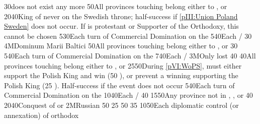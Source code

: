 {}{30}{\payshanse does not exist any more}%
%
%
{}{50}{All provinces touching \regionBaltique belong either to \SUE,
  \paysbrandebourg or \paysdanemark}%
%
%
{20}{40}{King of  never on the Swedish throne;
  half-success if \ref{pIII:Union Poland Sweden} does not occur. If \POL is
  protestant or Supporter of the Orthodoxy, this cannot be chosen}%
%
%
%
{5}{30}{Each turn of Commercial Domination on the }%
%
%
{5}{40}{Each \COL/\TP}%
%
%
{}{30}{}%
%
\EUobjective4M{Dominum Marii Baltici}{}%
{}{50}{All provinces touching \regionBaltique belong either to \SUE,
  \paysbrandebourg or \paysdanemark}%
%
%
{}{30}{}%
%
%
%
{5}{40}{Each turn of Commercial Domination on the }%
%
%
{7}{40}{Each \COL/\TP}%
%
\EUobjective3M{Only \provinceNeva lost}{}%
{}{40}{}%
%
%
{}{40}{All provinces touching \regionBaltique belong either to \SUE,
  \paysbrandebourg or \paysdanemark}%
%
%
{25}{50}{During \ref{pVI:WoPS}, \SUE must either support the Polish King and
  win (50 \VPs), or prevent a winning \FRA supporting the Polish King (25
  \VPs). Half-success if the event does not occur}%
%
%
%
{5}{40}{Each turn of Commercial Domination on the }%
%
%
{10}{40}{Each \COL/\TP}%
%
%
{}{40}{}%
%
 {15}{50}{Any province
  not in \regionNorvege, \regionDanemark, \regionFinlande or \regionSuede}%
%
%
{}{40}{}%
%
 
%
%
{20}{40}{Conquest of \payspskov or \paysryazan}%
%
\EUobjective2M{Russian \provinceSmolenska}{}%
{}{50}{}%
%
%
{}{25}{}%
%
%
{}{50}{}%
%
%
{}{35}{}%
%
%
%
{10}{50}{Each diplomatic control (or annexation) of orthodox \MIN}%
